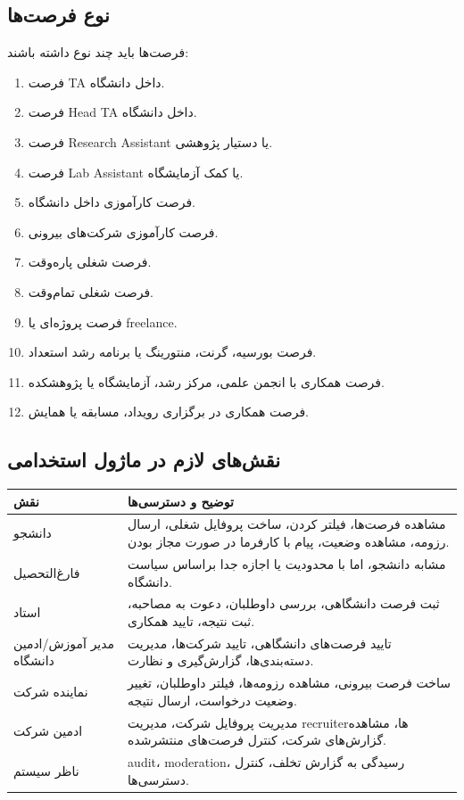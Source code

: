 \documentclass[12pt,a4paper]{article}
\begin{document}
\subsection{نوع فرصت‌ها}
فرصت‌ها باید چند نوع داشته باشند:
\begin{enumerate}
\item فرصت TA داخل دانشگاه.
\item فرصت Head TA داخل دانشگاه.
\item فرصت Research Assistant یا دستیار پژوهشی.
\item فرصت Lab Assistant یا کمک آزمایشگاه.
\item فرصت کارآموزی داخل دانشگاه.
\item فرصت کارآموزی شرکت‌های بیرونی.
\item فرصت شغلی پاره‌وقت.
\item فرصت شغلی تمام‌وقت.
\item فرصت پروژه‌ای یا freelance.
\item فرصت بورسیه، گرنت، منتورینگ یا برنامه رشد استعداد.
\item فرصت همکاری با انجمن علمی، مرکز رشد، آزمایشگاه یا پژوهشکده.
\item فرصت همکاری در برگزاری رویداد، مسابقه یا همایش.
\end{enumerate}

\subsection{نقش‌های لازم در ماژول استخدامی}
\begin{longtable}{p{}p{}}
\toprule
\textbf{نقش} & \textbf{توضیح و دسترسی‌ها}\\
\midrule
دانشجو & مشاهده فرصت‌ها، فیلتر کردن، ساخت پروفایل شغلی، ارسال رزومه، مشاهده وضعیت، پیام با کارفرما در صورت مجاز بودن.\\
فارغ‌التحصیل & مشابه دانشجو، اما با محدودیت یا اجازه جدا براساس سیاست دانشگاه.\\
استاد & ثبت فرصت دانشگاهی، بررسی داوطلبان، دعوت به مصاحبه، ثبت نتیجه، تایید همکاری.\\
مدیر آموزش/ادمین دانشگاه & تایید فرصت‌های دانشگاهی، تایید شرکت‌ها، مدیریت دسته‌بندی‌ها، گزارش‌گیری و نظارت.\\
نماینده شرکت & ساخت فرصت بیرونی، مشاهده رزومه‌ها، فیلتر داوطلبان، تغییر وضعیت درخواست، ارسال نتیجه.\\
ادمین شرکت & مدیریت پروفایل شرکت، مدیریت recruiterها، مشاهده گزارش‌های شرکت، کنترل فرصت‌های منتشرشده.\\
ناظر سیستم & audit، moderation، رسیدگی به گزارش تخلف، کنترل دسترسی‌ها.\\
\bottomrule
\end{longtable}
\end{document}
